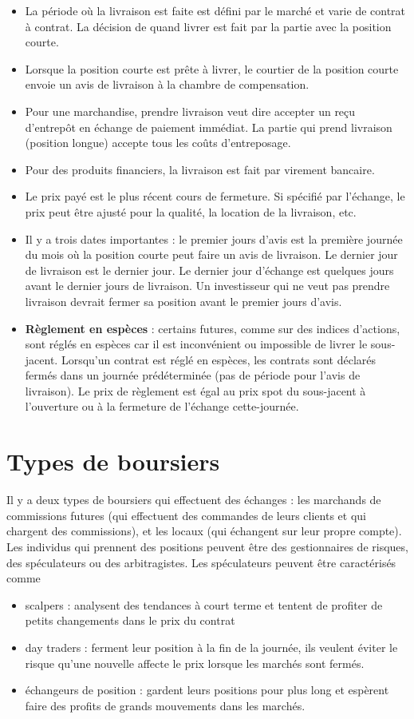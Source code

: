 \begin{itemize}
	\item La période où la livraison est faite est défini par le marché et varie de contrat à contrat. La décision de quand livrer est fait par la partie avec la position courte. 
	\item Lorsque la position courte est prête à livrer, le courtier de la position courte envoie un avis de livraison à la chambre de compensation. 
	\item Pour une marchandise, prendre livraison veut dire accepter un reçu d'entrepôt en échange de paiement immédiat. La partie qui prend livraison (position longue) accepte tous les coûts d'entreposage. 
	\item Pour des produits financiers, la livraison est fait par virement bancaire. 
	\item Le prix payé est le plus récent cours de fermeture. Si spécifié par l'échange, le prix peut être ajusté pour la qualité, la location de la livraison, etc. 
	\item Il y a trois dates importantes : le premier jours d'avis est la première journée du mois où la position courte peut faire un avis de livraison. Le dernier jour de livraison est le dernier jour. Le dernier jour d'échange est quelques jours avant le dernier jours de livraison. Un investisseur qui ne veut pas prendre livraison devrait fermer sa position avant le premier jours d'avis. 
	\item \textbf{Règlement en espèces} : certains futures, comme sur des indices d'actions, sont réglés en espèces car il est inconvénient ou impossible de livrer le sous-jacent. Lorsqu'un contrat est réglé en espèces, les contrats sont déclarés fermés dans un journée prédéterminée (pas de période pour l'avis de livraison). Le prix de règlement est égal au prix spot du sous-jacent à l'ouverture ou à la fermeture de l'échange cette-journée. 
\end{itemize}

\section{Types de boursiers}

Il y a deux types de boursiers qui effectuent des échanges : les marchands de commissions futures (qui effectuent des commandes de leurs clients et qui chargent des commissions), et les locaux (qui échangent sur leur propre compte). Les individus qui prennent des positions peuvent être des gestionnaires de risques, des spéculateurs ou des arbitragistes. Les spéculateurs peuvent être caractérisés comme 
\begin{itemize}
	\item scalpers : analysent des tendances à court terme et tentent de profiter de petits changements dans le prix du contrat
	\item day traders : ferment leur position à la fin de la journée, ils veulent éviter le risque qu'une nouvelle affecte le prix lorsque les marchés sont fermés. 
	\item échangeurs de position : gardent leurs positions pour plus long et espèrent faire des profits de grands mouvements dans les marchés. 
\end{itemize}

